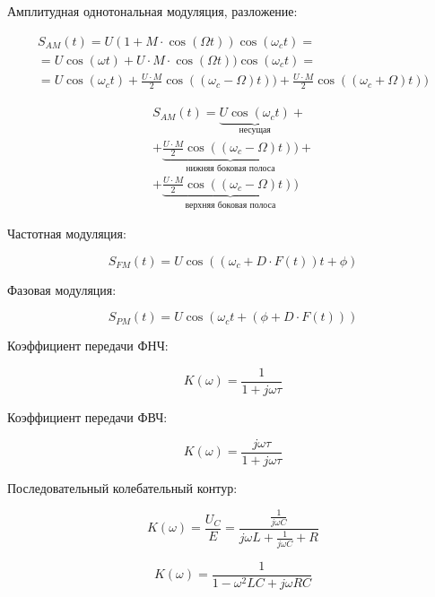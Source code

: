 \documentclass[
  a4paper,
]{book}
\theoremstyle{definition}
\theoremstyle{definition}
\theoremstyle{definition}
\theoremstyle{definition}
\theoremstyle{remark}
\begin{document}
Амплитудная однотональная модуляция, разложение:

\begin{eqnarray}
S_{AM}(t)=U(1+M \cdot \cos{(\Omega t)}) \cos{( \omega_{c} t)} = \nonumber
\\
 = U \cos{(\omega t)} +U \cdot M \cdot \cos{(\Omega t)}) \cos{(\omega_{c} t)} =\nonumber
\\
 = U \cos{(\omega_{c} t)} +\frac{U \cdot M}{2} \cos{((\omega_{c}-\Omega) t)}) + \frac{U \cdot M}{2} \cos{((\omega_{c}+\Omega) t)})
\end{eqnarray}

\begin{eqnarray}
S_{AM}(t)= \underbrace{U \cos{(\omega_{c} t)}}_{\text{несущая}} +\nonumber
\\
+ \underbrace{\frac{U \cdot M}{2} \cos{((\omega_{c}-\Omega) t)})}_{\text{нижняя боковая полоса}} +\nonumber
\\
+\underbrace{\frac{U \cdot M}{2} \cos{((\omega_{c}-\Omega) t)})}_{\text{верхняя боковая полоса}} \nonumber
\end{eqnarray}

Частотная модуляция:

\begin{equation}
S_{FM}(t)=U \cos{((\omega_{c}+D \cdot F(t)) t+\phi)}
\end{equation}

Фазовая модуляция:

\begin{equation}
S_{PM}(t)=U \cos{(\omega_{c} t+(\phi+D \cdot F(t)))}
\end{equation}

Коэффициент передачи ФНЧ:

\begin{equation}
K(\omega)= \frac {1}{1+j\omega \tau}
\end{equation}

Коэффициент передачи ФВЧ:

\begin{equation}
K(\omega)= \frac {j\omega \tau}{1+j\omega \tau}
\end{equation}

Последовательный колебательный контур:

\begin{equation}
K(\omega)= \frac{U_{C}}{E}= \frac { \frac{1}{j\omega C}}{j \omega L+ \frac{1}{j\omega C}+R}
\end{equation}

\begin{equation}
K(\omega)=  \frac {1}{1 -\omega^2 LC+j \omega RC}
\end{equation}
\end{document}
